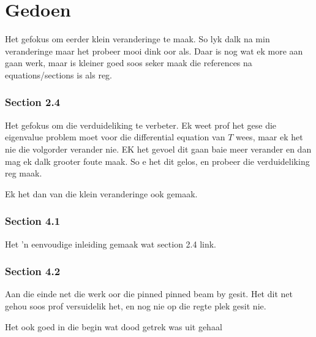 \documentclass[a4paper,10pt]{article}
\begin{document}
\section*{Gedoen}

Het gefokus om eerder klein veranderinge te maak. So lyk dalk na min veranderinge maar het probeer mooi dink oor als. Daar is nog wat ek more aan gaan werk, maar is kleiner goed soos seker maak die references na equations/sections is als reg.
\subsubsection*{Section 2.4}
Het gefokus om die verduideliking te verbeter. Ek weet prof het gese die eigenvalue problem moet voor die differential equation van $T$ wees, maar ek het nie die volgorder verander nie. EK het gevoel dit gaan baie meer verander en dan mag ek dalk grooter foute maak. So e het dit gelos, en probeer die verduideliking reg maak.

Ek het dan van die klein veranderinge ook gemaak.

\subsubsection*{Section 4.1}
Het 'n eenvoudige inleiding gemaak wat section 2.4 link.

\subsubsection*{Section 4.2}
Aan die einde net die werk oor die pinned pinned beam by gesit. Het dit net gehou soos prof versuidelik het, en nog nie op die regte plek gesit nie.

Het ook goed in die begin wat dood getrek was uit gehaal
\end{document}
